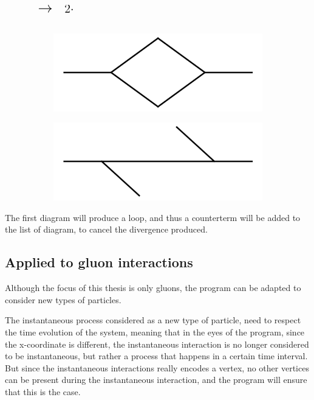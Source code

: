 \documentclass[11pt,a4paper,twoside,pdf]{article}
\numberwithin{equation}{section}
\begin{document}
\begin{figure}[h!]
\begin{subfigure}[t]{.1\textwidth}
    \end{subfigure}%
    $\displaystyle \quad %
    \raisebox{1.8\height}{\LARGE $\to$} $
    $\displaystyle \quad %
    \raisebox{1.2\height}{\Large $2\cdot$} $
    \begin{subfigure}[t]{.2\textwidth}
    \includegraphics[width=\textwidth]{plots/1to1_1.png}
    \end{subfigure}%
    \raisebox{1.3\height}{\Large $+$}\quad
    \raisebox{1.2\height}{\Large $4\cdot$}
    \begin{subfigure}[t]{.2\textwidth}
    \includegraphics[width=\textwidth]{plots/1to1_2.png}
    \end{subfigure}%
\end{figure}

The first diagram will produce a loop, and thus a counterterm will be added to the
list of diagram, to cancel the divergence produced.

\subsection{Applied to gluon interactions} \label{sec:applied_gluons}
Although the focus of this thesis is only gluons, 
the program can be adapted to consider new types of particles.

The instantaneous 
process considered as a new type of particle, need to respect the time 
evolution of the system, meaning that in the eyes of the program, since the x-coordinate
is different, the 
instantaneous interaction is no longer considered to be instantaneous, 
but rather a process that
happens in a certain time interval. But since the instantaneous interactions 
really encodes a vertex, no other vertices can be present during the instantaneous
interaction, and the program will ensure that this is the case.
\end{document}
